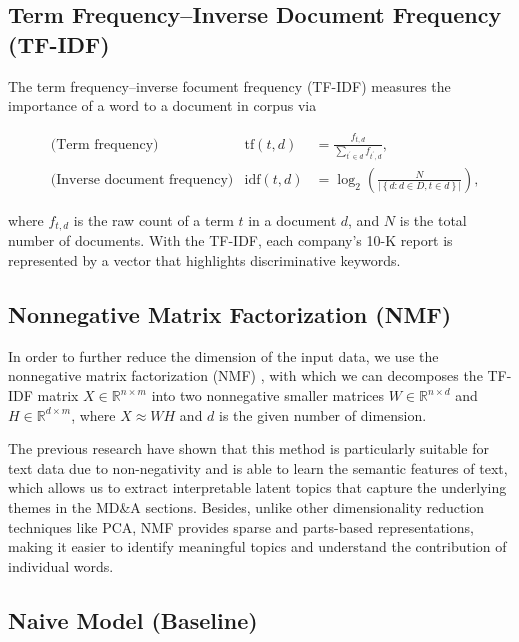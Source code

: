 \documentclass[11pt]{article}
\begin{document}
\subsection{Term Frequency–Inverse Document Frequency (TF-IDF)}

The term frequency–inverse focument frequency (TF-IDF) \cite{sparck1972statistical}\cite{robertson2004understanding} measures the importance of a word to a document in corpus via

$$
  \begin{aligned}
     & \text{(Term frequency)}             & \mathrm{tf}(t, d)  & = \frac{f_{t, d}}{\sum_{t^\prime \in d} f_{t^\prime, d}},                                     \\
     & \text{(Inverse document frequency)} & \mathrm{idf}(t, d) & = \log_2\left( \frac{N}{\left\vert \left\{ d: d \in D, t \in d \right\} \right\vert} \right),
  \end{aligned}
$$

where $f_{t, d}$ is the raw count of a term $t$ in a document $d$, and $N$ is the total number of documents. With the TF-IDF, each company's 10-K report is represented by a vector that highlights discriminative keywords.

\subsection{Nonnegative Matrix Factorization (NMF)}

In order to further reduce the dimension of the input data, we use the nonnegative matrix factorization (NMF) \cite{lee2000algorithms}, with which we can decomposes the TF-IDF matrix $X \in \mathbb{R}^{n \times m}$ into two nonnegative smaller matrices $W \in \mathbb{R}^{n \times d}$ and $H \in \mathbb{R}^{d \times m}$, where $X \approx W H$ and $d$ is the given number of dimension.

The previous research \cite{lee1999learning} have shown that this method is particularly suitable for text data due to non-negativity and is able to learn the semantic features of text, which allows us to extract interpretable latent topics that capture the underlying themes in the MD\&A sections. Besides, unlike other dimensionality reduction techniques like PCA, NMF provides sparse and parts-based representations, making it easier to identify meaningful topics and understand the contribution of individual words.

\subsection{Naive Model (Baseline)}
\end{document}
